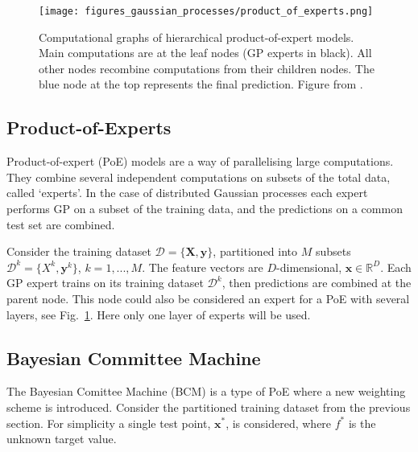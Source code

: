 \documentclass[twoside,english]{uiofysmaster}
\begin{document}
{{\begin{figure}
\texttt{[image: figures\_gaussian\_processes/product\_of\_experts.png]}
\caption[Product-of-expert models]{Computational graphs of hierarchical product-of-expert models. Main computations are at the leaf nodes (GP experts in black). All other nodes recombine computations from their children nodes. The blue node at the top represents the final prediction. Figure from \cite{deisenroth2015distributed}.}
\label{Fig:: gaussian process : DGP illustration of layers}
\end{figure}

\subsection{Product-of-Experts}

Product-of-expert (PoE) models are a way of parallelising large computations. They combine several independent computations on subsets of the total data, called `experts'. In the case of distributed Gaussian processes each expert performs GP on a subset of the training data, and the predictions on a common test set are combined. 

Consider the training dataset $\mathcal{D} = \{ \textbf{X}, \textbf{y}\}$, partitioned into $M$ subsets $\mathcal{D}^k = \{X^k, \textbf{y}^k \}$, $k = 1,...,M$. The feature vectors are $D$-dimensional, $\textbf{x} \in \mathbb{R}^D$. Each GP expert trains on its training dataset $\mathcal{D}^k$, then predictions are combined at the parent node. This node could also be considered an expert for a PoE with several layers, see Fig.~\ref{Fig:: gaussian process : DGP illustration of layers}. Here only one layer of experts will be used. 



\subsection{Bayesian Committee Machine}

The Bayesian Comittee Machine (BCM) \cite{tresp2000bayesian} is a type of PoE where a new weighting scheme is introduced. Consider the partitioned training dataset from the previous section. For simplicity a single test point, $\textbf{x}^*$, is considered, where $f^*$ is the unknown target value. 

}}
\end{document}
